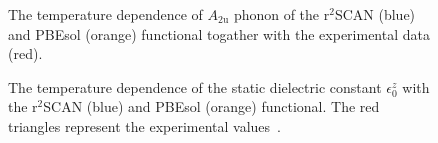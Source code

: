 \documentclass[luatex,onecolumn,showpacs,aps,preprint,prb,amsfonts,amsmath,amssymb,floatfix,groupedaddress, longbibliography]{revtex4-2}
\begin{document}



\begin{figure}[tb] %
\centering
\caption{The temperature dependence of $A_{\mathrm{2u}}$ phonon of the $\mathrm{r}^2$SCAN (blue) and PBEsol (orange) functional togather with the experimental data (red).} 
\label{fig:temp_a2u2}
\end{figure}

\begin{figure}[tb] %
\centering
\caption{The temperature dependence of the static dielectric constant $\epsilon_0^z$ with the $\mathrm{r}^2$SCAN (blue) and PBEsol (orange) functional. The red triangles represent the experimental values~\cite{parker1961static}.} 
\label{fig:temp_diel2}
\end{figure}




\end{document}
